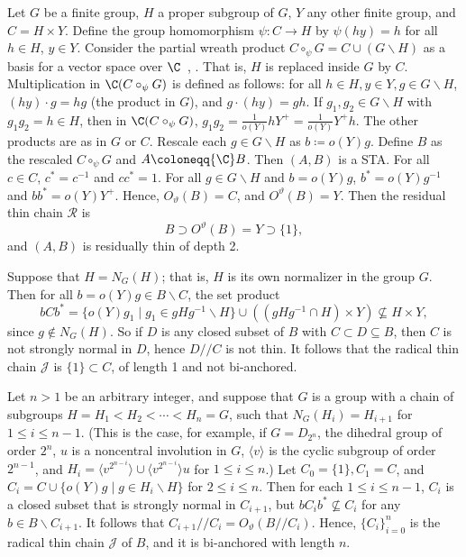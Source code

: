 \begin{exam}
\label{ex:rad_length}
Let $G$ be a finite group, $H$ a proper subgroup of $G$, $Y$ any other
finite group, and $C = H\times Y$. Define the group homomorphism $\psi
: C \rightarrow H$ by $\psi(hy) = h$ for all $h \in H$, $y \in Y$.
Consider the partial wreath product $C \circ_{\psi}G = C\cup
(G\backslash H)$ as a basis for a vector space over $\C$~\cite
[Definition 4.1, Definition 4.2]{Blau1}, \cite [Definition~1.13,
Definition~2.4]{Blau3}. That is, $H$ is replaced inside $G$ by $C$.
Multiplication in $\C(C\circ_{\psi}G)$ is defined as follows: for all
$h \in H, y \in Y, g \in G\backslash H$, $(hy)\cdot g = hg$ (the product
in $G$), and $g\cdot (hy) = gh$. If $g_1, g_2 \in G\backslash H$ with
$g_1g_2 = h \in H$, then in $\C(C\circ_{\psi}G)$, $g_1g_2 =
\frac{1}{o(Y)}hY^+ = \frac{1}{o(Y)}Y^+h$. The other products are as in
$G$ or $C$. Rescale each $g \in G\backslash H$ as $b \coloneqq o(Y)g$. Define
$B$ as the rescaled $C\circ_{\psi}G$ and $A \coloneqq {\C}B$. Then $(A, B)$ is a
STA. For all $c \in C$, $c^* = c^{-1}$ and $cc^* = 1$. For all $g \in
G\backslash H$ and $b = o(Y)g$, $b^* = o(Y)g^{-1}$ and $bb^* = o(Y)Y^+$.
Hence, $O_{\vartheta}(B) = C$, and $O^{\vartheta}(B) = Y$. Then the
residual thin chain $\mathcal{R}$ is
\[
 B \supset O^{\vartheta}(B) = Y \supset \{1\},
\]
and $(A, B)$ is residually thin of depth 2.

Suppose that $H = N_G(H)$; that is, $H$ is its own normalizer in the
group $G$. Then for all $b = o(Y)g \in B\backslash C$, the set product
\[
bCb^* = \{o(Y)g_1 \mid g_1 \in gHg^{-1}\backslash H\} \cup
((gHg^{-1}\cap H)\times Y) 
\not\subseteq H \times Y,
\] 
since $g \notin N_G(H)$. So if $D$ is any closed subset of $B$ with $C
\subset D \subseteq B$, then $C$ is not strongly normal in $D$, hence
$D//C$ is not thin. It follows that the radical thin chain
$\mathcal{J}$ is $\{1\} \subset C$, of length 1 and not bi-anchored.

Let $n > 1$ be an arbitrary integer, and suppose that $G$ is a group with a chain of subgroups $H = H_1 < H_2 <
\cdots < H_n = G$, such that $N_G(H_i) = H_{i+1}$ for $1 \leq i \leq
n-1$. (This is the case, for example, if $G = D_{2^n}$, the dihedral
group of order $2^n$, $u$ is a noncentral involution in $G$, $\langle v
\rangle$ is the cyclic subgroup of order $2^{n-1}$, and $H_i = \langle
v^{2^{n-i}}\rangle \cup \langle v^{2^{n-i}}\rangle u$ for $1 \leq i \leq
n$.) Let $C_0 = \{1\}, C_1 = C$, and $C_i = C\cup \{o(Y)g \mid g \in
H_i\backslash H\}$ for $2 \leq i \leq n$. Then for each $1 \leq i \leq n-1$, $C_i$
is a closed subset that is strongly normal in $C_{i+1}$, but $bC_ib^*
\not\subseteq C_i$ for any $b \in B\backslash C_{i+1}$. It follows that
$C_{i+1}//C_i = O_{\vartheta}(B//C_i)$. Hence, $\{C_i\}_{i=0}^n$ is the
radical thin chain $\mathcal{J}$ of $B$, and it is bi-anchored with
length $n$. 
 
\end{exam}

